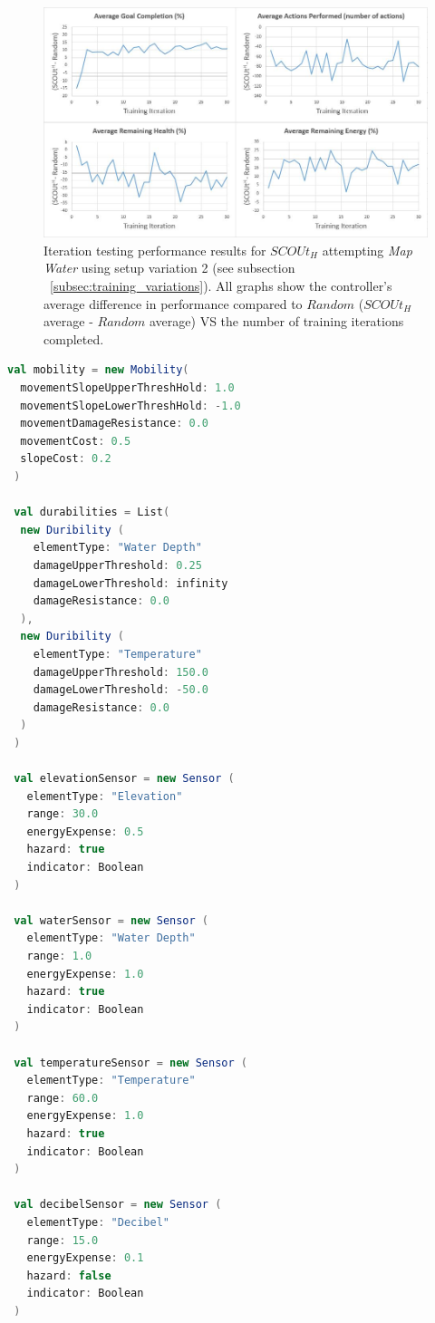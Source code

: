 \begin{figure}[H]
  \includegraphics[width=1.0\columnwidth]{Figures/Results/TrainingVariation2/Hybrid-MapWater.JPG}
  \caption{Iteration testing performance results for $SCOUt_{H}$ attempting \textit{Map Water} using setup variation 2 (see subsection ~\ref{subsec:training_variations}). All graphs show the controller's average difference in performance compared to $Random$ ($SCOUt_{H}$ average - $Random$ average) VS the number of training iterations completed.}
  \label{fig:hybrid_training_mw_variation2}
\end{figure}


\begin{lstlisting}[language=Scala, label=code:agent_setup]
 val mobility = new Mobility(
  movementSlopeUpperThreshHold: 1.0
  movementSlopeLowerThreshHold: -1.0
  movementDamageResistance: 0.0
  movementCost: 0.5
  slopeCost: 0.2
 )

 val durabilities = List(
  new Duribility (
    elementType: "Water Depth"
    damageUpperThreshold: 0.25
    damageLowerThreshold: infinity
    damageResistance: 0.0
  ),
  new Duribility (
    elementType: "Temperature"
    damageUpperThreshold: 150.0
    damageLowerThreshold: -50.0
    damageResistance: 0.0
  )
 )

 val elevationSensor = new Sensor (
   elementType: "Elevation"
   range: 30.0
   energyExpense: 0.5
   hazard: true
   indicator: Boolean
 )

 val waterSensor = new Sensor (
   elementType: "Water Depth"
   range: 1.0
   energyExpense: 1.0
   hazard: true
   indicator: Boolean
 )

 val temperatureSensor = new Sensor (
   elementType: "Temperature"
   range: 60.0
   energyExpense: 1.0
   hazard: true
   indicator: Boolean
 )

 val decibelSensor = new Sensor (
   elementType: "Decibel"
   range: 15.0
   energyExpense: 0.1
   hazard: false
   indicator: Boolean
 )
\end{lstlisting}
